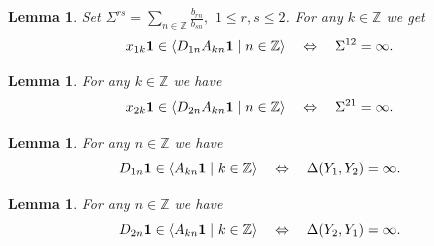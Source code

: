 \documentclass[preprint,12pt]{elsarticle}
\newtheorem{lem}[thm]{Lemma}
\numberwithin{equation}{section}
\begin{document}
\begin{lem}
\label{x1,dA}
Set $\Sigma^{rs}=\sum_{n\in{\mathbb Z}}\frac{b_{rn}}{b_{sn}},\,\,1\leq r,s\leq 2$. For any  $k\in {\mathbb Z}$ we get
 $$
 x_{1k}{\bf 1}\in\langle D_{1n}A_{kn}{\bf 1}\mid n\in{\mathbb Z}\rangle
 \quad\Leftrightarrow\quad \Sigma^{12}=
\infty.
$$
\end{lem}
\begin{lem}
\label{x2,dA}
 For any  $k\in {\mathbb Z}$ we have
 $$
 x_{2k}{\bf 1}\in\langle D_{2n}A_{kn}{\bf 1}\mid n\in{\mathbb Z}\rangle
 \quad\Leftrightarrow\quad  \Sigma^{21}=\infty.
$$
\end{lem}
%



\begin{lem}
\label{d1}
 For any  $n\in {\mathbb Z}$ we have
$$
D_{1n}{\bf 1}\in\langle A_{kn}{\bf 1}\mid k\in {\mathbb Z}\rangle
\quad\Leftrightarrow\quad 
\Delta(Y_1,Y_2)=\infty.
$$
\end{lem}

\begin{lem}
\label{d2} For any  $n\in {\mathbb Z}$ we have
$$
D_{2n}{\bf 1}\in\langle A_{kn}{\bf 1}\mid k\in {\mathbb Z}\rangle
\quad\Leftrightarrow\quad 
\Delta(Y_2,Y_1)=\infty.
$$
\end{lem}
%
\end{document}
